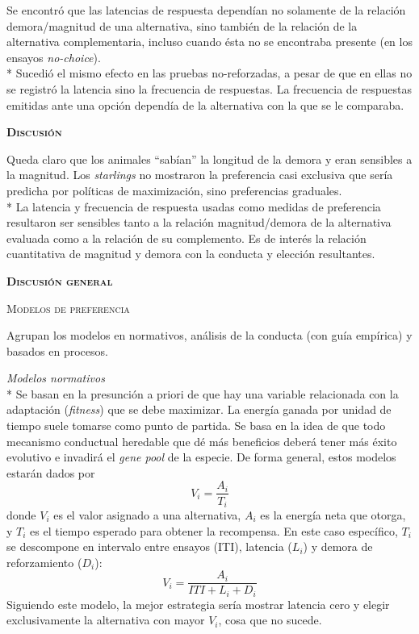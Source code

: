 \documentclass[a4paper,12pt]{article}
\begin{document}
Se encontró que las latencias de respuesta dependían no solamente de la relación demora/magnitud de una alternativa, sino también de la relación de la alternativa complementaria, incluso cuando ésta no se encontraba presente (en los ensayos {\slshape no-choice}). \\*
Sucedió el mismo efecto en las pruebas no-reforzadas, a pesar de que en ellas no se registró la latencia sino la frecuencia de respuestas. La frecuencia de respuestas emitidas ante una opción dependía de la alternativa con la que se le comparaba.

{\scshape\bfseries Discusión}

Queda claro que los animales ``sabían'' la longitud de la demora y eran sensibles a la magnitud. Los {\slshape starlings} no mostraron la preferencia casi exclusiva que sería predicha por políticas de maximización, sino preferencias graduales.\\*
La latencia y frecuencia de respuesta usadas como medidas de preferencia resultaron ser sensibles tanto a la relación magnitud/demora de la alternativa evaluada como a la relación de su complemento. Es de interés la relación cuantitativa de magnitud y demora con la conducta y elección resultantes.

{\scshape\bfseries Discusión general}

{\scshape Modelos de preferencia}

Agrupan los modelos en normativos, análisis de la conducta (con guía empírica) y basados en procesos.

{\slshape Modelos normativos}\\*
Se basan en la presunción a priori de que hay una variable relacionada con la adaptación ({\slshape fitness}) que se debe maximizar. La energía ganada por unidad de tiempo suele tomarse como punto de partida. Se basa en la idea de que todo mecanismo conductual heredable que dé más beneficios deberá tener más éxito evolutivo e invadirá el {\slshape gene pool} de la especie. De forma general, estos modelos estarán dados por $$V_i=\frac{A_i}{T_i}$$ donde $V_i$ es el valor asignado a una alternativa, $A_i$ es la energía neta que otorga, y $T_i$ es el tiempo esperado para obtener la recompensa. En este caso específico, $T_i$ se descompone en intervalo entre ensayos (ITI), latencia ($L_i$) y demora de reforzamiento ($D_i$): $$V_i=\frac{A_i}{ITI+L_i+D_i}$$
Siguiendo este modelo, la mejor estrategia sería mostrar latencia cero y elegir exclusivamente la alternativa con mayor $V_i$, cosa que no sucede.
\end{document}
